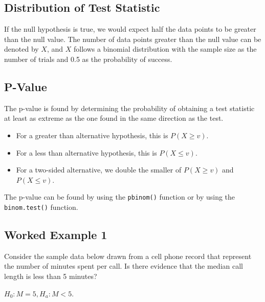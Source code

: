 \documentclass[
]{book}
\providecommand{\tightlist}{%
  \setlength{\itemsep}{0pt}\setlength{\parskip}{0pt}}
\theoremstyle{definition}
\theoremstyle{definition}
\theoremstyle{definition}
\theoremstyle{definition}
\theoremstyle{remark}
\begin{document}
\hypertarget{distribution-of-test-statistic}{%
\subsection{Distribution of Test Statistic}\label{distribution-of-test-statistic}}

If the null hypothesis is true, we would expect half the data points to be greater than the null value. The number of data points greater than the null value can be denoted by \(X\), and \(X\) follows a binomial distribution with the sample size as the number of trials and 0.5 as the probability of success.

\hypertarget{p-value}{%
\subsection{P-Value}\label{p-value}}

The p-value is found by determining the probability of obtaining a test statistic at least as extreme as the one found in the same direction as the test.

\begin{itemize}
\tightlist
\item
  For a greater than alternative hypothesis, this is \(P(X \geq v)\).
\item
  For a less than alternative hypothesis, this is \(P(X \leq v)\).
\item
  For a two-sided alternative, we double the smaller of \(P(X \geq v)\) and \(P(X \leq v)\).
\end{itemize}

The p-value can be found by using the \texttt{pbinom()} function or by using the \texttt{binom.test()} function.

\hypertarget{worked-example-1-1}{%
\subsection{Worked Example 1}\label{worked-example-1-1}}

Consider the sample data below drawn from a cell phone record that represent the number of minutes spent per call. Is there evidence that the median call length is less than 5 minutes?

\(H_0: M = 5, H_a: M < 5\).
\end{document}
